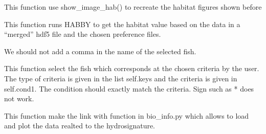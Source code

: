 \documentclass[letterpaper,10pt,english]{sphinxmanual}
\begin{document}
\begin{fulllineitems}
\begin{fulllineitems}
\end{fulllineitems}


\begin{fulllineitems}
\label{\detokenize{index:src_GUI.bio_info_GUI.BioInfo.recreate_fig}}
This function use show\_image\_hab() to recreate the habitat figures shown before

\end{fulllineitems}


\begin{fulllineitems}
\label{\detokenize{index:src_GUI.bio_info_GUI.BioInfo.run_habitat_value}}
This function runs HABBY to get the habitat value based on the data in a ``merged'' hdf5 file and the chosen
preference files.

We should not add a comma in the name of the selected fish.

\end{fulllineitems}


\begin{fulllineitems}
\label{\detokenize{index:src_GUI.bio_info_GUI.BioInfo.select_fish}}
This function select the fish which corresponds at the chosen criteria by the user. The type of criteria
is given in the list self.keys and the criteria is given in self.cond1. The condition should exactly
match the criteria. Sign such as * does not work.

\end{fulllineitems}


\begin{fulllineitems}
\label{\detokenize{index:src_GUI.bio_info_GUI.BioInfo.show_hydrosignature}}
This function make the link with function in bio\_info.py which allows to load and plot the data realted
to the hydrosignature.

\end{fulllineitems}


\end{fulllineitems}
\end{document}

